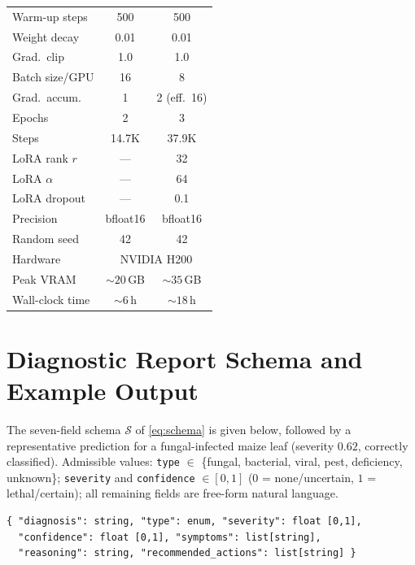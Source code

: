 \documentclass[runningheads]{llncs}
\begin{document}
\begin{table}[h]
\begin{minipage}[t]{0.48\textwidth}
\begin{tabular}{@{}lcc@{}}
Warm-up steps          & 500 & 500 \\
Weight decay           & 0.01 & 0.01 \\
Grad.\ clip & 1.0 & 1.0 \\
Batch size/GPU & 16 & 8 \\
Grad.\ accum. & 1 & 2 (eff.\ 16) \\
Epochs                 & 2 & 3 \\
Steps                  & 14.7K & 37.9K \\
LoRA rank $r$          & --- & 32 \\
LoRA $\alpha$          & --- & 64 \\
LoRA dropout           & --- & 0.1 \\
Precision              & bfloat16 & bfloat16 \\
Random seed            & 42 & 42 \\
\midrule
Hardware               & \multicolumn{2}{c}{NVIDIA H200} \\
Peak VRAM              & ${\sim}20$\,GB & ${\sim}35$\,GB \\
Wall-clock time        & ${\sim}6$\,h & ${\sim}18$\,h \\
\bottomrule
\end{tabular}
\end{minipage}
\end{table}

\section{Diagnostic Report Schema and Example Output}
\label{app:schema}

\noindent The seven-field schema $\mathcal{S}$ of \cref{eq:schema} is given
below, followed by a representative prediction for a fungal-infected maize
leaf (severity $0.62$, correctly classified). Admissible values:
\texttt{type} $\in$ \{fungal, bacterial, viral, pest, deficiency, unknown\};
\texttt{severity} and \texttt{confidence} $\in[0,1]$ ($0$ = none/uncertain,
$1$ = lethal/certain); all remaining fields are free-form natural language.

\begin{lstlisting}
{ "diagnosis": string, "type": enum, "severity": float [0,1],
  "confidence": float [0,1], "symptoms": list[string],
  "reasoning": string, "recommended_actions": list[string] }
\end{lstlisting}
\end{document}
